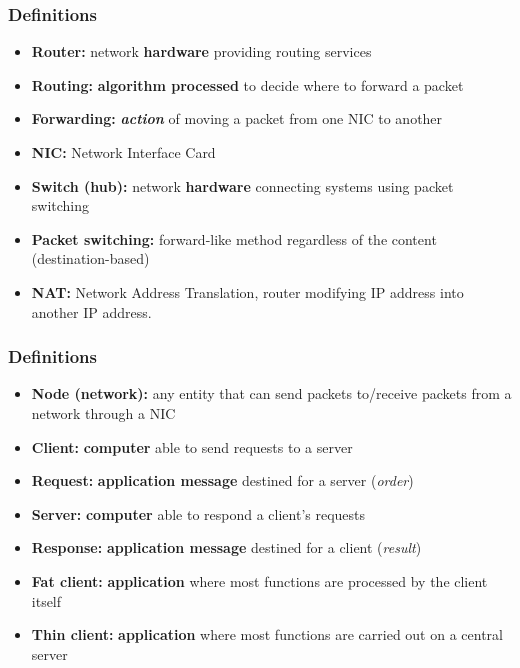   \begin{frame}
    \frametitle{Definitions}
      \begin{itemize}
        \item \textbf{Router:} network \textbf{hardware} providing routing services\pause
        \item \textbf{Routing:} \textbf{algorithm processed} to decide where to forward a packet\pause
        \item \textbf{Forwarding:} \textbf{\emph{action}} of moving a packet from one NIC to another\pause
        \item \textbf{NIC:} Network Interface Card
        \item \textbf{Switch (hub):} network \textbf{hardware} connecting systems using packet switching\pause
        \item \textbf{Packet switching:} forward-like method regardless of the content (destination-based)\pause
        \item \textbf{NAT:} Network Address Translation, router modifying IP address into another IP address.
      \end{itemize}
  \end{frame}
  \begin{frame}
    \frametitle{Definitions}
      \begin{itemize}
        \item \textbf{Node (network):} any entity that can send packets to/receive packets from a network through a NIC\pause
        \item \textbf{Client:} \textbf{computer} able to send requests to a server\pause
        \item \textbf{Request:} \textbf{application message} destined for a server (\emph{order})\pause
        \item \textbf{Server:} \textbf{computer} able to respond a client's requests\pause
        \item \textbf{Response:} \textbf{application message} destined for a client (\emph{result})\pause
        \item \textbf{Fat client:} \textbf{application} where most functions are processed by the client itself\pause
        \item \textbf{Thin client:} \textbf{application} where most functions are carried out on a central server
      \end{itemize}
  \end{frame}


